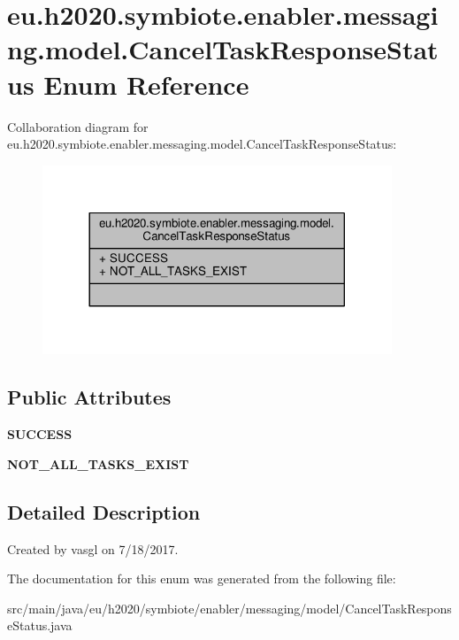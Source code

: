 \hypertarget{enumeu_1_1h2020_1_1symbiote_1_1enabler_1_1messaging_1_1model_1_1CancelTaskResponseStatus}{}\section{eu.\+h2020.\+symbiote.\+enabler.\+messaging.\+model.\+Cancel\+Task\+Response\+Status Enum Reference}
\label{enumeu_1_1h2020_1_1symbiote_1_1enabler_1_1messaging_1_1model_1_1CancelTaskResponseStatus}


Collaboration diagram for eu.\+h2020.\+symbiote.\+enabler.\+messaging.\+model.\+Cancel\+Task\+Response\+Status\+:
\nopagebreak
\begin{figure}[H]
\begin{center}
\leavevmode
\includegraphics[width=296pt]{enumeu_1_1h2020_1_1symbiote_1_1enabler_1_1messaging_1_1model_1_1CancelTaskResponseStatus__coll__graph}
\end{center}
\end{figure}
\subsection*{Public Attributes}
\begin{DoxyCompactItemize}
\item 
\mbox{\label{enumeu_1_1h2020_1_1symbiote_1_1enabler_1_1messaging_1_1model_1_1CancelTaskResponseStatus_a6267a3e687115bd5129daa2e5002513d}} 
{\bfseries S\+U\+C\+C\+E\+SS}
\item 
\mbox{\label{enumeu_1_1h2020_1_1symbiote_1_1enabler_1_1messaging_1_1model_1_1CancelTaskResponseStatus_aceea4c0dedde0577def8baf84c53e180}} 
{\bfseries N\+O\+T\+\_\+\+A\+L\+L\+\_\+\+T\+A\+S\+K\+S\+\_\+\+E\+X\+I\+ST}
\end{DoxyCompactItemize}


\subsection{Detailed Description}
Created by vasgl on 7/18/2017. 

The documentation for this enum was generated from the following file\+:\begin{DoxyCompactItemize}
\item 
src/main/java/eu/h2020/symbiote/enabler/messaging/model/Cancel\+Task\+Response\+Status.\+java\end{DoxyCompactItemize}
